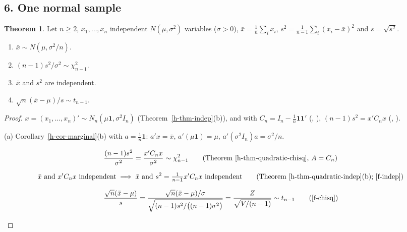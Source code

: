 \documentclass[12pt]{article}
\newcommand{\one}{\mathbf 1}
\DeclareMathOperator{\rank}{rank}
\DeclareMathOperator\prb{\mathsf{P}}
\theoremstyle{definition}
\newtheorem{theorem}{Theorem}
\begin{document}
\subsection*{6. One normal sample}

\begin{theorem}\label{h-thm-one-sample}
Let \(n\geqslant2\), \(x_1,\dots,x_n\) independent \(N(\mu,\sigma^2)\) variables (\(\sigma>0\)),
\(\bar x=\frac1n\sum_ix_i\), \(s^2=\frac1{n-1}\sum_i(x_i-\bar x)^2\) and \(s=\sqrt{s^2}\).
\begin{enumerate}
\item \(\bar x\sim N(\mu,\sigma^2/n)\).
\item \((n-1)s^2/\sigma^2\sim\chi^2_{n-1}\).
\item \(\bar x\) and \(s^2\) are independent.
\item \(\sqrt n(\bar x-\mu)/s\sim t_{n-1}\).
\end{enumerate}
\end{theorem}
\begin{proof}
\(x=(x_1,\dots,x_n)'\sim N_n(\mu\one,\sigma^2I_n)\) (Theorem~\ref{h-thm-indep}(b)), and with
\(C_n=I_n-\frac1n\one\one'\) (, ), \((n-1)s^2=x'C_nx\) (, ).

(a) Corollary~\ref{h-cor-marginal}(b) with \(a=\frac1n\one\): \(a'x=\bar x\), \(a'(\mu\one)=\mu\),
\(a'(\sigma^2I_n)a=\sigma^2/n\).
\begin{board}[(b) \(C_n'=C_n=C_n^2\), \(C_n\one=0\) (\lec{1}, \lit{Proposition~15}), \(\rank C_n=n-1\geqslant1\) (\lec{8},
\lit{Example~5}):]
\[
\frac{(n-1)s^2}{\sigma^2}=\frac{x'C_nx}{\sigma^2}\sim\chi^2_{n-1}\qquad\text{(Theorem~\ref{h-thm-quadratic-chisq}, \(A=C_n\))}
\]
\end{board}
\begin{board}[(c) \(K=\frac1n\one'\): \(Kx=\bar x\), \(KC_n=\frac1n(C_n\one)'=0\) (\lec{1}, \lit{Theorem~8}, \lit{Proposition~15}):]
\[
\bar x\text{ and }x'C_nx\text{ independent}\implies\bar x\text{ and }s^2=\tfrac1{n-1}x'C_nx\text{ independent}
\qquad\text{(Theorem~\ref{h-thm-quadratic-indep}(b); \ref{f-indep})}
\]
\end{board}
\begin{board}[(d) \(Z=\sqrt n(\bar x-\mu)/\sigma\sim N(0,1)\) ((a); Theorem~\ref{h-thm-linear}),
\(V=(n-1)s^2/\sigma^2\sim\chi^2_{n-1}\) ((b)), independent ((c); \ref{f-indep}); \(\prb(V=0)=0\) (\ref{f-quantile}),
so \(s>0\) with probability \(1\):]
\[
\frac{\sqrt n(\bar x-\mu)}s=\frac{\sqrt n(\bar x-\mu)/\sigma}{\sqrt{(n-1)s^2/\bigl((n-1)\sigma^2\bigr)}}
=\frac Z{\sqrt{V/(n-1)}}\sim t_{n-1}\qquad\text{(\ref{f-chisq})}
\]
\end{board}
\nopagebreak
\end{proof}
\end{document}
